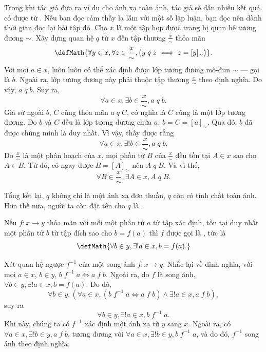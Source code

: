 Trong khi tác giả đưa ra ví dụ cho ánh xạ toàn ánh, tác giả sẽ dẫn nhiều kết quả có được từ . Nếu bạn đọc cảm thấy lạ lẫm với một số lập luận, bạn đọc nên dành thời gian đọc lại bài tập đó. Cho $x$ là một tập hợp được trang bị quan hệ tương đương $\sim$. Xây dựng quan hệ $q$ từ $x$ đến tập thương $\frac{x}{\sim}$ thỏa mãn
\begin{equation*}
   \defMath{\forall y \in x, \forall z \in \frac{x}{\sim}, \big(y\;q\;z \iff z = [y]_\sim\big)}.
\end{equation*}
Với mọi $a \in x$, luôn luôn có thể xác định được lớp tương đương mô-đun $\sim$ --- gọi là $b$. Ngoài ra, lớp tương đương này phải thuộc tập thương $\frac{x}{\sim}$ theo định nghĩa. Do vậy, $a\;q\;b$. Suy ra,
\begin{equation*}
   \forall a \in x, \exists b \in \frac{x}{\sim}, a\;q\;b.
\end{equation*}
Giả sử ngoài $b$, $C$ cũng thỏa mãn $a\;q\;C$, có nghĩa là $C$ cũng là một lớp tương đương. Do $b$ và $C$ đều là lớp tương đương chứa $a$, $b = C = [a]_\sim$. Qua đó, $b$ đã được chứng minh là duy nhất. Vì vậy, thấy được rằng
\begin{equation*}
   \forall a \in x, \exists ! b \in \frac{x}{\sim}, a\;q\;b.
\end{equation*}
Do $\frac{x}{\sim}$ là một phân hoạch của $x$, mọi phần tử $B$ của $\frac{x}{\sim}$ đều tồn tại $A \in x$ sao cho $A \in B$. Từ đó, có ngay được $B = [A]_\sim$ nên $A\;q\;B$. Và vì thế,
\begin{equation*}
   \forall B \in \frac{x}{\sim}, \exists A \in x, A\;q\;B.
\end{equation*}

Tổng kết lại, $q$ không chỉ là một ánh xạ đơn thuần, $q$ còn có tính chất toàn ánh. Hơn thế nữa, người ta còn đặt tên cho $q$ là .

Nếu $f: x \to y$ thỏa mãn với mỗi một phần tử $a$ từ tập xác định, tồn tại duy nhất một phần tử $b$ từ tập đích sao cho $b = f(a)$ thì $f$ được gọi là , tức là \begin{equation*}
   \defMath{\forall b \in y, \exists ! a \in x, b = f(a).}
\end{equation*} 

Xét quan hệ ngược $f^{-1}$ của một song ánh $f: x \to y$. Nhắc lại về định nghĩa, với mọi $a \in x$, $b \in y$, $b\;f^{-1}\;a \iff a\;f\;b$. Ngoài ra, do $f$ là song ánh, $\forall b \in y, \exists ! a \in x, b = f(a)$. Do đó, \begin{equation*}
   \forall b \in y, \left(\forall a \in x, \left(b\;f^{-1}\;a \iff a\;f\;b\right) \land \exists ! a \in x, a \;f \;b\right),
\end{equation*}
suy ra \begin{equation*}
   \forall b \in y, \exists ! a \in x, b\;f^{-1}\;a.
\end{equation*}
Khi này, chúng ta có $f^{-1}$ xác định một ánh xạ từ $y$ sang $x$. Ngoài ra, có $\forall a \in x, \exists ! b \in y, a\;f\;b$, tương đương với $\forall a \in x, \exists ! b \in y, b\;f^{-1}\;a$, và do đó, $f^{-1}$ song ánh theo định nghĩa.

